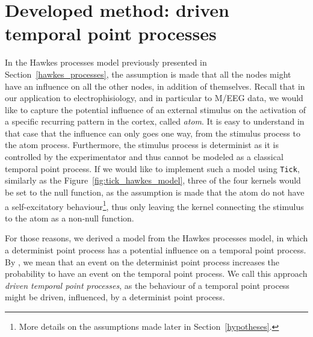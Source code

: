 \section{Developed method: driven temporal point processes}\label{developed_method}

In the Hawkes processes model previously presented in Section~\ref{hawkes_processes}, the assumption is made that all the nodes might have an influence on all the other nodes, in addition of themselves.
Recall that in our application to electrophisiology, and in particular to M/EEG data, we would like to capture the potential influence of an external stimulus on the activation of a specific recurring pattern in the cortex, called \textit{atom}.
It is easy to understand in that case that the influence can only goes one way, from the stimulus process to the atom process.
Furthermore, the stimulus process is determinist as it is controlled by the experimentator and thus cannot be modeled as a classical temporal point process.
If we would like to implement such a model using \texttt{Tick}, similarly as the Figure~\ref{fig:tick_hawkes_model}, three of the four kernels would be set to the null function, as the assumption is made that the atom do not have a self-excitatory behaviour\footnote{More details on the assumptions made later in Section~\ref{hypotheses}.}, thus only leaving the kernel connecting the stimulus to the atom as a non-null function.

For those reasons, we derived a model from the Hawkes processes model, in which a determinist point process has a potential influence on a temporal point process.
By , we mean that an event on the determinist point process increases the probability to have an event on the temporal point process.
We call this approach \textit{driven temporal point processes}, as the behaviour of a temporal point process might be driven, influenced, by a determinist point process.







